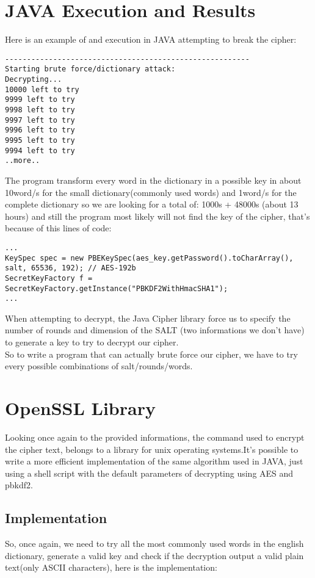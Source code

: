 \documentclass{article}
\begin{document}
\section{JAVA Execution and Results}\label{sec:javaExec}
Here is an example of and execution in JAVA attempting to break the cipher:

\begin{verbatim}
--------------------------------------------------------
Starting brute force/dictionary attack:
Decrypting...
10000 left to try
9999 left to try
9998 left to try
9997 left to try
9996 left to try
9995 left to try
9994 left to try
..more..
\end{verbatim}

The program transform every word in the dictionary in a possible key in about 10word/s for the small dictionary(commonly used words) and 1word/s for the complete dictionary so we are looking for a total of: 1000s + 48000s (about 13 hours) and still the program most likely will not find the key of the cipher, that's because of this lines of code:

\begin{verbatim}
...
KeySpec spec = new PBEKeySpec(aes_key.getPassword().toCharArray(), 
salt, 65536, 192); // AES-192b
SecretKeyFactory f = SecretKeyFactory.getInstance("PBKDF2WithHmacSHA1");
...
\end{verbatim}

When attempting to decrypt, the Java Cipher library force us to specify the number of rounds and dimension of the SALT (two informations we don't have) to generate a key to try to decrypt our cipher.\\
So to write a program that can actually brute force our cipher, we have to try every possible combinations of salt/rounds/words.\\

\section{OpenSSL Library}
Looking once again to the provided informations, the command used to encrypt the cipher text, belongs to a library for unix operating systems.It's possible to write a more efficient implementation of the same algorithm used in JAVA, just using a shell script with the default parameters of decrypting using AES and pbkdf2.

\subsection{Implementation}
So, once again, we need to try all the most commonly used words in the english dictionary, generate a valid key and check if the decryption output a valid plain text(only ASCII characters), here is the implementation:
\end{document}
